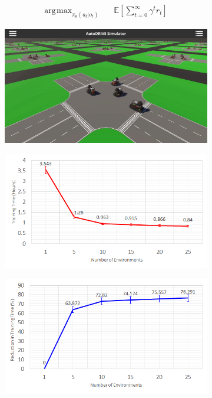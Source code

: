 \documentclass[letterpaper, 10 pt, conference]{ieeeconf}  %
\DeclareMathOperator*{\argmax}{\arg\!\max} %
\begin{document}
	\begin{align}
	\label{eqn5}
	\argmax_{\pi_\theta \left(a_t|o_t\right)} \quad &\mathbb{E}\left [ \sum_{t=0}^{\infty} \gamma^t r_t \right ]
	\end{align}
	
	\begin{figure}[t]
		\centering
		\begin{subfigure}[b]{0.32\linewidth}
			\centering
			\includegraphics[width=\linewidth]{Fig7a.png}
			\caption{}
			\label{fig7a}
		\end{subfigure}
		\hfill
		\begin{subfigure}[b]{0.32\linewidth}
			\centering
			\includegraphics[width=\linewidth]{Fig7b.png}
			\caption{}
			\label{fig7b}
		\end{subfigure}
		\hfill
		\begin{subfigure}[b]{0.32\linewidth}
			\centering
			\includegraphics[width=\linewidth]{Fig7c.png}

\end{subfigure}
\end{figure}
\end{document}
